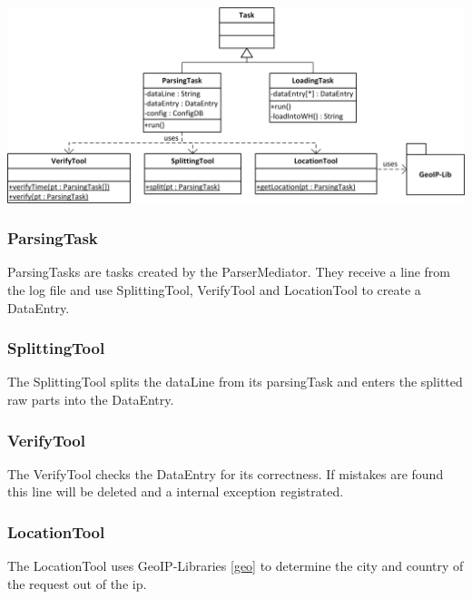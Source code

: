 
\begin{center}
\includegraphics[width=1\linewidth]{Pictures/Parts/TaskTool.png}
\end{center}  

\subsubsection*{ParsingTask}
ParsingTasks are tasks created by the ParserMediator. They receive a line from the log file and use  
SplittingTool, VerifyTool and LocationTool to create a DataEntry. 


\subsubsection*{SplittingTool}
The SplittingTool splits the dataLine from its parsingTask and enters the splitted raw parts into the DataEntry.

\subsubsection*{VerifyTool}
The VerifyTool checks the DataEntry for its correctness. %
If mistakes are found this line will be deleted and a internal exception registrated. 

\subsubsection*{LocationTool}
The LocationTool uses GeoIP-Libraries \ref{geo} to determine the city and country of the request out of the ip.

